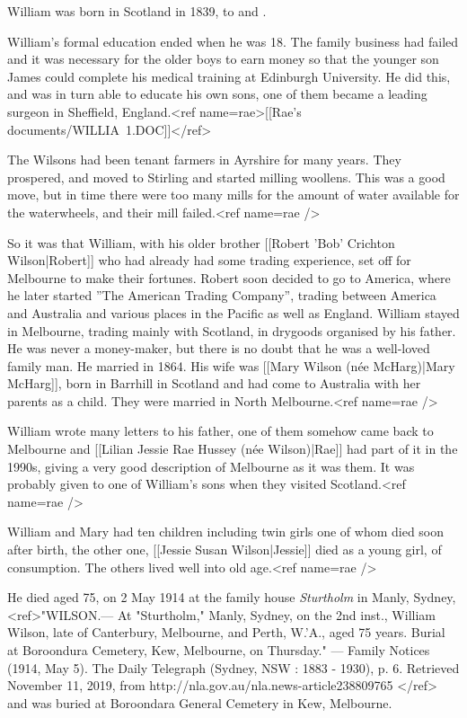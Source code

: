 
William was born in Scotland in 1839, to  and .

William's formal education ended when he was 18.
The family business had failed and it was necessary for the older boys to earn money
so that the younger son James could complete his medical training at Edinburgh University.
He did this, and was in turn able to educate his own sons, one of them became a leading surgeon in Sheffield, England.<ref name=rae>[[Rae's documents/WILLIA~1.DOC]]</ref>

The Wilsons had been tenant farmers in Ayrshire for many years. They prospered, and moved to Stirling and started milling woollens. This was a good move, but in time there were too many mills for the amount of water available for the waterwheels, and their mill failed.<ref name=rae />

So it was that William, with his older brother [[Robert 'Bob' Crichton Wilson|Robert]]
who had already had some trading experience, set off for Melbourne to make their fortunes.
Robert soon decided to go to America, where he later started ''The American Trading Company'',
trading between America and Australia and various places in the Pacific as well as England.
William stayed in Melbourne, trading mainly with Scotland, in drygoods organised by his father.
He was never a money-maker, but there is no doubt that he was a well-loved family man. He married in 1864.
His wife was [[Mary Wilson (née McHarg)|Mary McHarg]], born in Barrhill in Scotland and had come
to Australia with her parents as a child. They were married in North Melbourne.<ref name=rae />

William wrote many letters to his father, one of them somehow came back to Melbourne and
[[Lilian Jessie Rae Hussey (née Wilson)|Rae]] had part of it in the 1990s, giving a very
good description of Melbourne as it was them. It was probably given to one of William's sons when they visited Scotland.<ref name=rae />

William and Mary had ten children including twin girls one of whom died soon after birth,
the other one, [[Jessie Susan Wilson|Jessie]] died as a young girl, of consumption. The others lived well into old age.<ref name=rae />

He died aged 75, on 2 May 1914 at the family house \emph{Sturtholm} in Manly, Sydney,
<ref>"WILSON.— At "Sturtholm," Manly, Sydney, on the 2nd inst., William Wilson, late of Canterbury, Melbourne, and Perth,
W.'A., aged 75 years. Burial at Boroondura Cemetery, Kew, Melbourne, on Thursday."
--- Family Notices (1914, May 5). The Daily Telegraph (Sydney, NSW : 1883 - 1930), p. 6.
Retrieved November 11, 2019, from http://nla.gov.au/nla.news-article238809765
</ref> and was buried at Boroondara General Cemetery in Kew, Melbourne.
